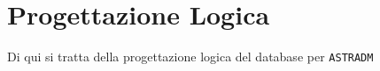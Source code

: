 \chapter{Progettazione Logica}
Di qui si tratta della progettazione logica del database per
\texttt{ASTRADM}



